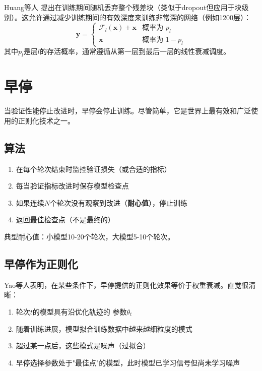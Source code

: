 Huang等人 \cite{huang2016deep}提出在训练期间随机丢弃整个残差块（类似于dropout但应用于块级别）。这允许通过减少训练期间的有效深度来训练非常深的网络（例如1200层）：
\begin{equation}
\mathbf{y} = \begin{cases} \mathcal{F}_l(\mathbf{x}) + \mathbf{x} & \text{概率为 } p_l \\ \mathbf{x} & \text{概率为 } 1 - p_l \end{cases}
\end{equation}
其中$p_l$是层$l$的存活概率，通常遵循从第一层到最后一层的线性衰减调度。

\section{早停}

当验证性能停止改进时，早停会停止训练。尽管简单，它是世界上最有效和广泛使用的正则化技术之一。

\subsection{算法}

\begin{enumerate}
    \item 在每个轮次结束时监控验证损失（或合适的指标）
    \item 每当验证指标改进时保存模型检查点
    \item 如果连续$N$个轮次没有观察到改进（\textbf{耐心值}），停止训练
    \item 返回最佳检查点（不是最终的）
\end{enumerate}

典型耐心值：小模型10-20个轮次，大模型5-10个轮次。

\subsection{早停作为正则化}

Yao等人表明，在某些条件下，早停提供的正则化效果等价于权重衰减。直觉很清晰：

\begin{enumerate}
    \item 轮次$t$的模型具有沿优化轨迹的 参数$\theta_t$
    \item 随着训练进展，模型拟合训练数据中越来越细粒度的模式
    \item 超过某一点后，这些模式是噪声（过拟合）
    \item 早停选择参数处于"最佳点"的模型，此时模型已学习信号但尚未学习噪声
\end{enumerate}

